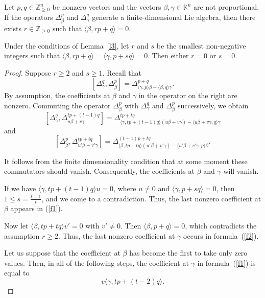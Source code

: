 \documentclass[10pt,a4paper]{amsart}
\begin{document}
\begin{lemma} \label{l3}
Let $p,q\in\mathbb{Z}^n_{\ge 0}$ be nonzero vectors and the vectors $\beta,\gamma\in\mathbb{K}^n$ are not proportional. If the operators $\Delta^p_{\beta}$ and $\Delta^q_{\gamma}$ generate a finite-dimensional Lie algebra, then there exists $r\in\mathbb{Z}_{\ge 0}$ such that $\langle\beta,rp+q\rangle=0$. 
\end{lemma}

\begin{lemma} \label{l4}
Under the conditions of Lemma~\ref{l3}, let $r$ and $s$ be the smallest non-negative integers such that $\langle\beta,rp+q\rangle=\langle\gamma,p+sq\rangle=0$. Then either $r=0$ or $s=0$. 
\end{lemma}

\begin{proof}
Suppose $r\ge 2$ and $s\ge 1$. Recall that 
$$
[\Delta^q_{\gamma}, \Delta^p_{\beta}]=\Delta^{p+q}_{\langle\gamma,p\rangle\beta-\langle\beta,q\rangle\gamma}.
$$
By assumption, the coefficients at $\beta$ and $\gamma$ in the operator on the right are nonzero. Commuting the operator $\Delta^p_{\beta}$ with $\Delta^q_{\gamma}$ and $\Delta^p_{\beta}$ successively, we obtain
\begin{equation} \label{f1}
[\Delta^q_{\gamma}, \Delta^{tp+(t-1)q}_{u\beta+v\gamma}]=\Delta^{tp+tq}_{\langle\gamma, tp+(t-1)q\rangle(u\beta+v\gamma)-\langle u\beta+v\gamma,q\rangle\gamma}
\end{equation}
and
\begin{equation} \label{f2}
[\Delta^p_{\beta}, \Delta^{tp+tq}_{u'\beta+v'\gamma}]=\Delta^{(t+1)p+tq}_{\langle\beta, tp+tq\rangle(u'\beta+v'\gamma)-\langle u'\beta+v'\gamma,p\rangle\beta}. 
\end{equation}

It follows from the finite dimensionality condition that at some moment these commutators should vanish. Consequently, the coefficients at $\beta$ and $\gamma$ will vanish. 

If we have $\langle\gamma, tp+(t-1)q\rangle u=0$, where $u\ne 0$ and $\langle\gamma,p+sq\rangle=0$, then $1\le s=\frac{t-1}{t}$, and we come to a contradiction. Thus, the last nonzero coefficient at $\beta$ appears in (\ref{f1}).

Now let $\langle\beta,tp+tq\rangle v'=0$ with $v'\ne 0$. Then $\langle\beta,p+q\rangle=0$, which contradicts the assumption $r\ge 2$. Thus, the last nonzero coefficient at $\gamma$ occurs in formula~(\ref{f2}). 

Let us suppose that the coefficient at $\beta$ has become the first to take only zero values. Then, in all of the following steps, the coefficient at $\gamma$ in formula~(\ref{f1}) is equal to
$$
v\langle\gamma,tp+(t-2)q\rangle.
$$ 


\end{proof}
\end{document}
